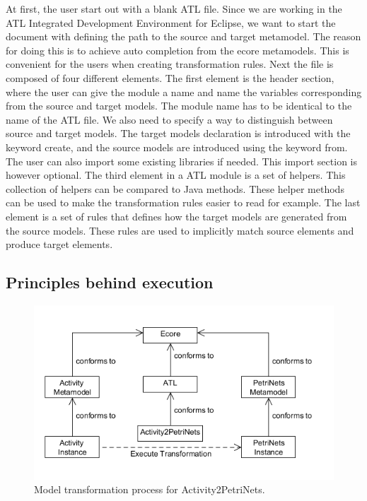 \documentclass[pdftex,11pt,a4paper]{article}
\begin{document}
At first, the user start out with a blank ATL file. Since we are working in
the ATL Integrated Development Environment for Eclipse, we want to start the
document with defining the path to the source and target metamodel. The
reason for doing this is to achieve auto completion from the ecore metamodels.
This is convenient for the users when creating transformation rules. Next the
file is composed of four different elements. The first element is the header
section, where the user can give the module a name and name the variables
corresponding from the source and target models. The module name has to be
identical to the name of the ATL file. We also need to specify a way to
distinguish between source and target models. The target models declaration is
introduced with the keyword create, and the source models are introduced using
the keyword from. The user can also import some existing libraries if needed.
This import section is however optional. The third element in a ATL module is a
set of helpers. This collection of helpers can be compared to Java methods.
These helper methods can be used to make the transformation rules easier to read
for example. The last element is a set of rules that defines how the target
models are generated from the source models. These rules are used to implicitly
match source elements and produce target elements. 

\subsection{Principles behind execution}

\begin{figure}[H]
	\centering
	\includegraphics[scale=0.5]{figures/ATL.png}
	\caption{Model transformation process for Activity2PetriNets.}
	\label{fig:ATL}
\end{figure}
\end{document}
